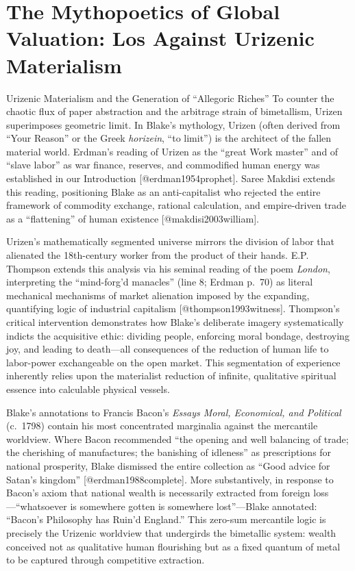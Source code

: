 \documentclass[
  ignorenonframetext,
]{beamer}
\author{\texorpdfstring{}{}}
\date{}
\begin{document}
\section{The Mythopoetics of Global Valuation: Los Against Urizenic
Materialism}\label{the-mythopoetics-of-global-valuation-los-against-urizenic-materialism}

\begin{frame}{Urizenic Materialism and the Generation of ``Allegoric
Riches''}
\protect{}\label{sec-urizenic-materialism}
To counter the chaotic flux of paper abstraction and the arbitrage
strain of bimetallism, Urizen superimposes geometric limit. In Blake's
mythology, Urizen (often derived from ``Your Reason'' or the Greek
\emph{horizein}, ``to limit'') is the architect of the fallen material
world. Erdman's reading of Urizen as the ``great Work master'' and of
``slave labor'' as war finance, reserves, and commodified human energy
was established in our Introduction {[}@erdman1954prophet{]}. Saree
Makdisi extends this reading, positioning Blake as an anti-capitalist
who rejected the entire framework of commodity exchange, rational
calculation, and empire-driven trade as a ``flattening'' of human
existence {[}@makdisi2003william{]}.

Urizen's mathematically segmented universe mirrors the division of labor
that alienated the 18th-century worker from the product of their hands.
E.P. Thompson extends this analysis via his seminal reading of the poem
\emph{London}, interpreting the ``mind-forg'd manacles'' (line 8; Erdman
p.~70) as literal mechanical mechanisms of market alienation imposed by
the expanding, quantifying logic of industrial capitalism
{[}@thompson1993witness{]}. Thompson's critical intervention
demonstrates how Blake's deliberate imagery systematically indicts the
acquisitive ethic: dividing people, enforcing moral bondage, destroying
joy, and leading to death---all consequences of the reduction of human
life to labor-power exchangeable on the open market. This segmentation
of experience inherently relies upon the materialist reduction of
infinite, qualitative spiritual essence into calculable physical
vessels.

Blake's annotations to Francis Bacon's \emph{Essays Moral, Economical,
and Political} (c.~1798) contain his most concentrated marginalia
against the mercantile worldview. Where Bacon recommended ``the opening
and well balancing of trade; the cherishing of manufactures; the
banishing of idleness'' as prescriptions for national prosperity, Blake
dismissed the entire collection as ``Good advice for Satan's kingdom''
{[}@erdman1988complete{]}. More substantively, in response to Bacon's
axiom that national wealth is necessarily extracted from foreign
loss---``whatsoever is somewhere gotten is somewhere lost''---Blake
annotated: ``Bacon's Philosophy has Ruin'd England.'' This zero-sum
mercantile logic is precisely the Urizenic worldview that undergirds the
bimetallic system: wealth conceived not as qualitative human flourishing
but as a fixed quantum of metal to be captured through competitive
extraction.


\end{frame}
\end{document}
